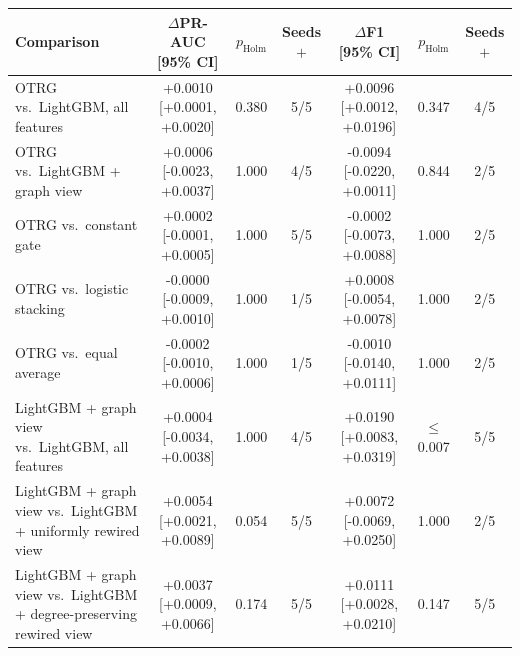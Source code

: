 \begin{tabular}{lcccccc}
\toprule
Comparison & $\Delta$PR-AUC [95\% CI] & $p_{\mathrm{Holm}}$ & Seeds $+$ & $\Delta$F1 [95\% CI] & $p_{\mathrm{Holm}}$ & Seeds $+$ \\
\midrule
OTRG vs.\ LightGBM, all features & +0.0010 [+0.0001, +0.0020] & 0.380 & 5/5 & +0.0096 [+0.0012, +0.0196] & 0.347 & 4/5 \\
OTRG vs.\ LightGBM + graph view & +0.0006 [-0.0023, +0.0037] & 1.000 & 4/5 & -0.0094 [-0.0220, +0.0011] & 0.844 & 2/5 \\
OTRG vs.\ constant gate & +0.0002 [-0.0001, +0.0005] & 1.000 & 5/5 & -0.0002 [-0.0073, +0.0088] & 1.000 & 2/5 \\
OTRG vs.\ logistic stacking & -0.0000 [-0.0009, +0.0010] & 1.000 & 1/5 & +0.0008 [-0.0054, +0.0078] & 1.000 & 2/5 \\
OTRG vs.\ equal average & -0.0002 [-0.0010, +0.0006] & 1.000 & 1/5 & -0.0010 [-0.0140, +0.0111] & 1.000 & 2/5 \\
LightGBM + graph view vs.\ LightGBM, all features & +0.0004 [-0.0034, +0.0038] & 1.000 & 4/5 & +0.0190 [+0.0083, +0.0319] & $\le$0.007 & 5/5 \\
LightGBM + graph view vs.\ LightGBM + uniformly rewired view & +0.0054 [+0.0021, +0.0089] & 0.054 & 5/5 & +0.0072 [-0.0069, +0.0250] & 1.000 & 2/5 \\
LightGBM + graph view vs.\ LightGBM + degree-preserving rewired view & +0.0037 [+0.0009, +0.0066] & 0.174 & 5/5 & +0.0111 [+0.0028, +0.0210] & 0.147 & 5/5 \\
\bottomrule
\end{tabular}
